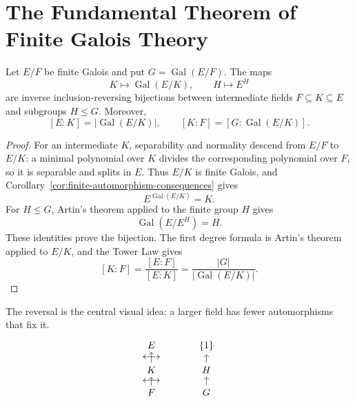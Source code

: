 \section{The Fundamental Theorem of Finite Galois Theory}

\begin{theorem}\label{thm:finite-galois}
Let \(E/F\) be finite Galois and put \(G=\operatorname{Gal}(E/F)\).  The maps
\[
K\longmapsto\operatorname{Gal}(E/K),
\qquad
H\longmapsto E^H
\]
are inverse inclusion-reversing bijections between intermediate fields
\(F\subseteq K\subseteq E\) and subgroups \(H\leq G\).  Moreover,
\[
[E:K]=|\operatorname{Gal}(E/K)|,
\qquad
[K:F]=[G:\operatorname{Gal}(E/K)].
\]
\end{theorem}
\begin{proof}
For an intermediate \(K\), separability and normality descend from \(E/F\)
to \(E/K\): a minimal polynomial over \(K\) divides the corresponding
polynomial over \(F\), so it is separable and splits in \(E\).  Thus \(E/K\)
is finite Galois, and Corollary~\ref{cor:finite-automorphism-consequences}
gives
\[
E^{\operatorname{Gal}(E/K)}=K.
\]
For \(H\leq G\), Artin's theorem applied to the finite group \(H\) gives
\[
\operatorname{Gal}(E/E^H)=H.
\]
These identities prove the bijection.  The first degree formula is Artin's
theorem applied to \(E/K\), and the Tower Law gives
\[
[K:F]=\frac{[E:F]}{[E:K]}
=\frac{|G|}{|\operatorname{Gal}(E/K)|}.
\]
\end{proof}

The reversal is the central visual idea: a larger field has fewer
automorphisms that fix it.
\[
\begin{tikzcd}[column sep=large,row sep=small]
E \arrow[d,phantom,"\longleftrightarrow" description] & \{1\} \\
K \arrow[u] \arrow[d,phantom,"\longleftrightarrow" description] & H \arrow[u] \\
F \arrow[u] & G \arrow[u]
\end{tikzcd}
\]

